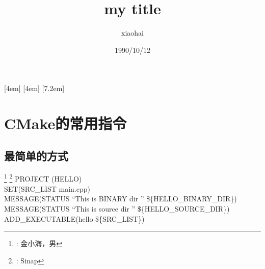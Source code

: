 \documentclass[11pt,UTF8,hyperref,openany,noindent]{ctexbook}
\author{xiaohai}
\date{1990/10/12}
\title{my title}
\begin{document}

\maketitle

[4em]{\addvspace{2.3mm}\bf}{%
  \contentslabel{4.0em}}{}{\titlerule*[5pt]{$\cdot$}\contentspage}
[4em]{}{\contentslabel{2.5em}}{}{%
  \titlerule*[5pt]{$\cdot$}\contentspage}
[7.2em]{}{\contentslabel{3.3em}}{}{%
  \titlerule*[5pt]{$\cdot$}\contentspage}
\tableofcontents


\chapter{CMake的常用指令}
\section{最简单的方式}

\renewcommand{\thefootnote}{}
\footnote{: 金小海，男}
\footnote{: Sinap}
\setcounter{footnote}{0}
\renewcommand{\thefootnote}{\arabic{footnote}}
\noindent PROJECT (HELLO)\\
SET(SRC\_LIST main.cpp)\\
MESSAGE(STATUS \textquotedblleft{This is BINARY dir }\textquotedblright{} \$\{HELLO\_BINARY\_DIR\})\\
MESSAGE(STATUS \textquotedblleft{This is source dir} \textquotedblright{} \$\{HELLO\_SOURCE\_DIR\})\\
ADD\_EXECUTABLE(hello \$\{SRC\_LIST\})\\

\end{document}
